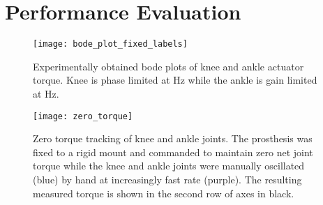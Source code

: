 \section{Performance Evaluation}\label{sec:pros_perf_eval}

\begin{figure}[htb]
    \centering 
    \texttt{[image: bode\_plot\_fixed\_labels]}
    \caption{Experimentally obtained bode plots of knee and ankle actuator
    torque. Knee is phase limited at \unit[24]{Hz} while the ankle is gain
    limited at \unit[7]{Hz}.}\label{fig:pros_design_bode_plots}
\end{figure}

\begin{figure}[htb]
    \centering 
    \texttt{[image: zero\_torque]}
    \caption{Zero torque tracking of knee and ankle joints. The prosthesis was
    fixed to a rigid mount and commanded to maintain zero net joint torque while
    the knee and ankle joints were manually oscillated (blue) by hand at
    increasingly fast rate (purple). The resulting measured torque is shown in
    the second row of axes in black.}\label{fig:pros_design_bode_plots}
\end{figure}

